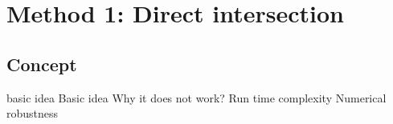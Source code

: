 
\chapter{Method 1: Direct intersection}
\label{ch:direct_intersection}

\section{Concept}
\label{sec:direct_intersection_concept}


basic idea
Basic idea
Why it does not work?
Run time complexity
Numerical robustness
